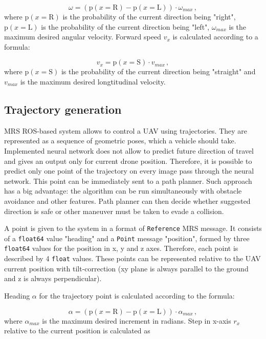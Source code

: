 \begin{equation}
	\omega = (\textrm{p}(x = \textrm{R}) - \textrm{p}(x = \textrm{L}))\cdot\omega_{max}\,,
\end{equation}
where $\textrm{p}(x = \textrm{R})$ is the probability of the current direction being "right", $\textrm{p}(x = \textrm{L})$ is the probability of the current direction being "left", $\omega_{max}$ is the maximum desired angular velocity. Forward speed $v_x$ is calculated according to a formula:

\begin{equation}
	v_x = \textrm{p}(x = \textrm{S})\cdot v_{max}\,,
\end{equation}
where $\textrm{p}(x = \textrm{S})$ is the probability of the current direction being "straight" and $v_{max}$ is the maximum desired longtitudinal velocity.


\subsection{Trajectory generation}

MRS ROS-based system allows to control a UAV using trajectories. They are represented as a sequence of geometric poses, which a vehicle should take. Implemented neural network does not allow to predict future direction of travel and gives an output only for current drone position. Therefore, it is possible to predict only one point of the trajectory on every image pass through the neural network. This point can be immediately sent to a path planner. Such approach has a big advantage: the algorithm can be run simultaneously with obstacle avoidance and other features. Path planner can then decide whether suggested direction is safe or other maneuver must be taken to evade a collision.

A point is given to the system in a format of \texttt{Reference} MRS message. It consists of a \texttt{float64} value "heading" and a \texttt{Point} message "position", formed by three \texttt{float64} values for the position in x, y and z axes. Therefore, each point is described by 4 \texttt{float} values. These points can be represented relative to the UAV current position with tilt-correction (xy plane is always parallel to the ground and z is always perpendicular). 

Heading $\alpha$ for the trajectory point is calculated according to the formula:

\begin{equation}
	\alpha = (\textrm{p}(x = \textrm{R}) - \textrm{p}(x = \textrm{L}))\cdot \alpha_{max}\,,
\end{equation}
where $\alpha_{max}$ is the maximum desired increment in radians. Step in x-axis $r_x$ relative to the current position is calculated as

